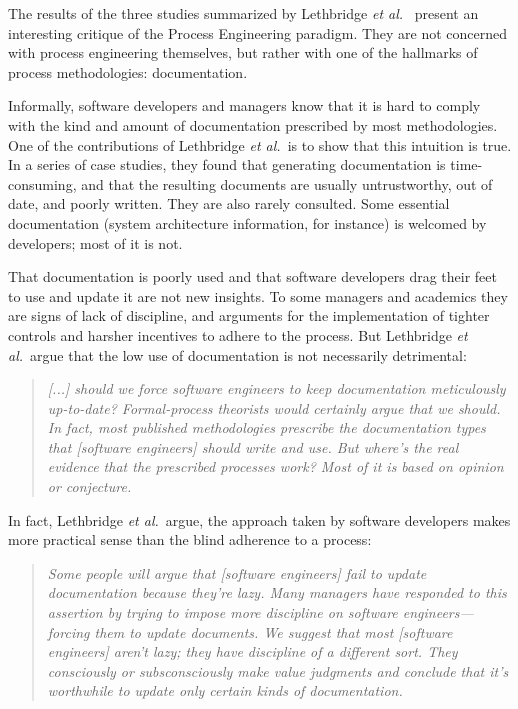 The results of the three studies summarized by Lethbridge \emph{et al.}\  present an interesting critique of the Process Engineering paradigm. They are not concerned with process engineering themselves, but rather with one of the hallmarks of process methodologies: documentation.

Informally, software developers and managers know that it is hard to comply with the kind and amount of documentation prescribed by most methodologies. One of the contributions of Lethbridge \emph{et al.}\ is to show that this intuition is true. In a series of case studies, they found that generating documentation is time-consuming, and that the resulting documents are usually untrustworthy, out of date, and poorly written. They are also rarely consulted. Some essential documentation (system architecture information, for instance) is welcomed by developers; most of it is not.

That documentation is poorly used and that software developers drag their feet to use and update it are not new insights. To some managers and academics they are signs of lack of discipline, and arguments for the implementation of tighter controls and harsher incentives to adhere to the process. But Lethbridge \emph{et al.}\ argue that the low use of documentation is not necessarily detrimental:

\begin{quote}
\emph{[...] should we force software engineers to keep documentation meticulously up-to-date? Formal-process theorists would certainly argue that we should. In fact, most published methodologies prescribe the documentation types that [software engineers] should write and use. But where's the real evidence that the prescribed processes work? Most of it is based on opinion or conjecture.}
\end{quote}

In fact, Lethbridge \emph{et al.}\ argue, the approach taken by software developers makes more practical sense than the blind adherence to a process:

\begin{quote}
\emph{Some people will argue that [software engineers] fail to update documentation because they're lazy. Many managers have responded to this assertion by trying to impose more discipline on software engineers---forcing them to update documents. We suggest that most [software engineers] aren't lazy; they have discipline of a different sort. They consciously or subsconsciously make value judgments and conclude that it's worthwhile to update only certain kinds of documentation.}
\end{quote}

